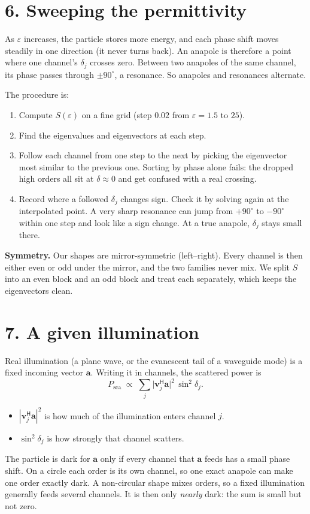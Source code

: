 \documentclass[10pt,a4paper]{article}
\begin{document}
\section*{6. Sweeping the permittivity}
As $\varepsilon$ increases, the particle stores more energy, and each phase shift moves steadily
in one direction (it never turns back). An anapole is therefore a point where one channel's
$\delta_j$ crosses zero. Between two anapoles of the same channel, its phase passes through
$\pm90^\circ$, a resonance. So anapoles and resonances alternate.

The procedure is:
\begin{enumerate}
\item Compute $S(\varepsilon)$ on a fine grid (step $0.02$ from $\varepsilon = 1.5$ to $25$).
\item Find the eigenvalues and eigenvectors at each step.
\item Follow each channel from one step to the next by picking the eigenvector most similar to the
previous one. Sorting by phase alone fails: the dropped high orders all sit at $\delta\approx0$
and get confused with a real crossing.
\item Record where a followed $\delta_j$ changes sign. Check it by solving again at the
interpolated point. A very sharp resonance can jump from $+90^\circ$ to $-90^\circ$ within one step
and look like a sign change. At a true anapole, $\delta_j$ stays small there.
\end{enumerate}

\textbf{Symmetry.} Our shapes are mirror-symmetric (left--right). Every channel is then either
even or odd under the mirror, and the two families never mix. We split $S$ into an even block and
an odd block and treat each separately, which keeps the eigenvectors clean.

\section*{7. A given illumination}
Real illumination (a plane wave, or the evanescent tail of a waveguide mode) is a fixed incoming
vector $\mathbf a$. Writing it in channels, the scattered power is
\[
P_{\mathrm{sca}} \;\propto\; \sum_j \bigl|\mathbf v_j^{\mathsf H}\mathbf a\bigr|^2 \,\sin^2\delta_j .
\]
\begin{itemize}
\item $|\mathbf v_j^{\mathsf H}\mathbf a|^2$ is how much of the illumination enters channel $j$.
\item $\sin^2\delta_j$ is how strongly that channel scatters.
\end{itemize}
The particle is dark for $\mathbf a$ only if every channel that $\mathbf a$ feeds has a small
phase shift. On a circle each order is its own channel, so one exact anapole can make one order
exactly dark. A non-circular shape mixes orders, so a fixed illumination generally feeds several
channels. It is then only \emph{nearly} dark: the sum is small but not zero.
\end{document}
